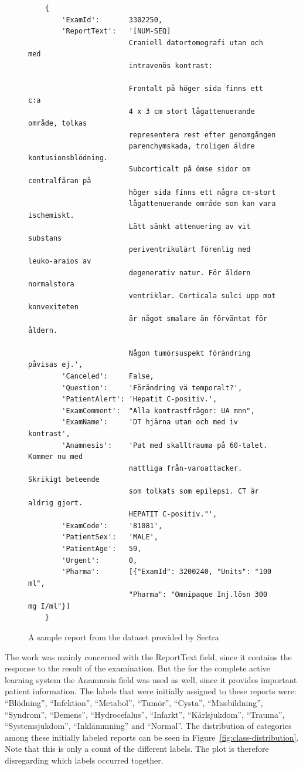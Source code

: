 \begin{figure}
\begin{verbatim}
    {
        'ExamId':       3302250, 
        'ReportText':   '[NUM-SEQ] 
                        Craniell datortomografi utan och med 
                        intravenös kontrast:
                        
                        Frontalt på höger sida finns ett c:a 
                        4 x 3 cm stort lågattenuerande område, tolkas 
                        representera rest efter genomgången 
                        parenchymskada, troligen äldre kontusionsblödning. 
                        Subcorticalt på ömse sidor om centralfåran på 
                        höger sida finns ett några cm-stort 
                        lågattenuerande område som kan vara ischemiskt. 
                        Lätt sänkt attenuering av vit substans 
                        periventrikulärt förenlig med leuko-araios av 
                        degenerativ natur. För åldern normalstora 
                        ventriklar. Corticala sulci upp mot konvexiteten 
                        är något smalare än förväntat för åldern. 
                        
                        Någon tumörsuspekt förändring påvisas ej.',
        'Canceled':     False, 
        'Question':     'Förändring vä temporalt?',
        'PatientAlert': 'Hepatit C-positiv.', 
        'ExamComment':  "Alla kontrastfrågor: UA mnn", 
        'ExamName':     'DT hjärna utan och med iv kontrast',
        'Anamnesis':    'Pat med skalltrauma på 60-talet. Kommer nu med 
                        nattliga från-varoattacker. Skrikigt beteende 
                        som tolkats som epilepsi. CT är aldrig gjort. 
                        HEPATIT C-positiv."',
        'ExamCode':     '81081', 
        'PatientSex':   'MALE', 
        'PatientAge':   59, 
        'Urgent':       0, 
        'Pharma':       [{"ExamId": 3200240, "Units": "100 ml", 
                        "Pharma": "Omnipaque Inj.lösn 300 mg I/ml"}]
    }
\end{verbatim}
\caption{A sample report from the dataset provided by Sectra}
\label{fig:sample-report}
\end{figure}

The work was mainly concerned with the ReportText field, since it contains the response to the result of the examination.
But the for the complete active learning system the Anamnesis field was used as well, since it provides important patient information.
The labels that were initially assigned to these reports were:
``Blödning'', ``Infektion'', ``Metabol'', ``Tumör'', ``Cysta'', ``Missbildning'', ``Syndrom'', ``Demens'', ``Hydrocefalus'', ``Infarkt'', ``Kärlsjukdom'', ``Trauma'', ``Systemsjukdom'', ``Inklämmning'' and ``Normal''.
The distribution of categories among these initially labeled reports can be seen in Figure~\ref{fig:class-distribution}.
Note that this is only a count of the different labels.
The plot is therefore disregarding which labels occurred together.

